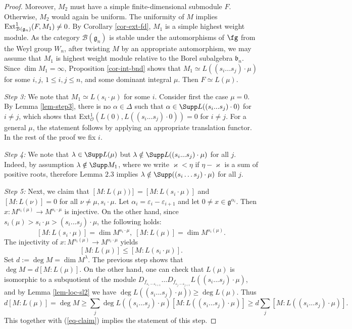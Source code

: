 \documentclass[12pt]{amsart}
\def\gb{\mathfrak{b}}
\def\gg{\mathfrak{g}}
\begin{document}
\begin{proof}
Moreover, $M_2$ must have a simple finite-dimensional submodule $F$. Otherwise, $M_2$ would again be uniform. The uniformity of $M$ implies ${\rm Ext}^1_{\mathcal B (\gg_n)} (F, M_1) \neq 0$. By Corollary \ref{cor-ext-fd}, $M_1$ is a simple highest weight module. As the category $\mathcal B (\gg_n)$ is stable under the automorphisms of $\fg$ from the Weyl group $W_n$, after twisting $M$ by an appropriate automorphism, we may assume that $M_1$ is highest weight module relative to the  Borel subalgebra $\gb_n$.  Since $\dim M_1=\infty$,  Proposition \ref{cor-int-bnd} shows that $M_1 \simeq L((s_i...s_j) \cdot \mu)$ for some $i,j$, $1 \leq i,j \leq n$, and some dominant integral $\mu$. Then $F \simeq L(\mu)$. 

{\it Step 3:} We note that $M_1\simeq L(s_i \cdot \mu)$ for some $i$. Consider first the case $\mu=0$.  By  Lemma \ref{lem-step3}, there is no $\alpha\in\Delta$ such that $\alpha\in \Supp L((s_i...s_j)\cdot 0)$ for $i\neq j$, which shows that Ext$^1_{\mathcal{O}}(L(0),L((s_i...s_j)\cdot 0)) = 0$ for $i\neq j$. For a general $\mu$, the statement follows by applying an appropriate translation functor. In the rest of the proof we fix $i$.


{\it Step 4:} We note that  $\lambda \in \Supp L(\mu)$ but $\lambda \notin \Supp L((s_i...s_j) \cdot \mu)$ for all $j$. Indeed, by assumption $\lambda\notin \Supp M_1$, where we write $\varkappa<\eta$ if $\eta-\varkappa$ is a sum of positive roots, therefore Lemma $2.3$ implies  $\lambda\notin \Supp ((s_i\dots s_j)\cdot \mu)$ for all $j$.

{\it Step 5:} Next, we claim that $[M:L (\mu))] = [M: L(s_i \cdot \mu)]$ and $[M:L(\nu)] = 0$ for all $\nu \neq \mu, s_i\cdot \mu$. Let $\alpha_i = \varepsilon_i - \varepsilon_{i+1}$ and let $0\neq x \in \gg^{\alpha_i}$. Then $x : M^{s_i (\mu)} \to M^{s_i \cdot \mu}$ is injective. On the other hand, since $s_i (\mu) > s_i \cdot \mu  > (s_i...s_j)\cdot \mu$, the following holds:
$$
[M: L(s_i \cdot \mu)] = \dim M^{s_i \cdot \mu}, \; [M: L(\mu)] = \dim M^{s_i (\mu)}.
$$ 
 The injectivity of $x : M^{s_i (\mu)} \to M^{s_i \cdot \mu}$ yields
\begin{equation}\label{eq-claim}
[M: L(\mu)]  \leq [M: L(s_i \cdot \mu)] .
\end{equation}
Set $d := \deg M = \dim M^{\lambda}$. The previous step shows that  $\deg M = d  [M: L(\mu)]$. On the other hand, one can check that $L(\mu)$ is isomorphic to a subquotient of the module $D_{f_{\varepsilon_{i} - \varepsilon_{i+1}}} \ldots D_{f_{\varepsilon_{j} - \varepsilon_{j+1}}} L((s_i...s_j) \cdot \mu) $, and by Lemma  \ref{lem-loc-sl2} we have $\deg L( (s_i...s_j) \cdot \mu)) \geq \deg L(\mu).$ Thus
$$
d [M: L(\mu)] =\deg M \geq  \sum_j \deg L(  (s_i...s_j) \cdot \mu) [M: L( (s_i...s_j) \cdot \mu)] \geq d \sum_j [M: L( (s_i...s_j) \cdot \mu)].
$$
This together with (\ref{eq-claim}) implies the statement of this step.


\end{proof}
\end{document}
